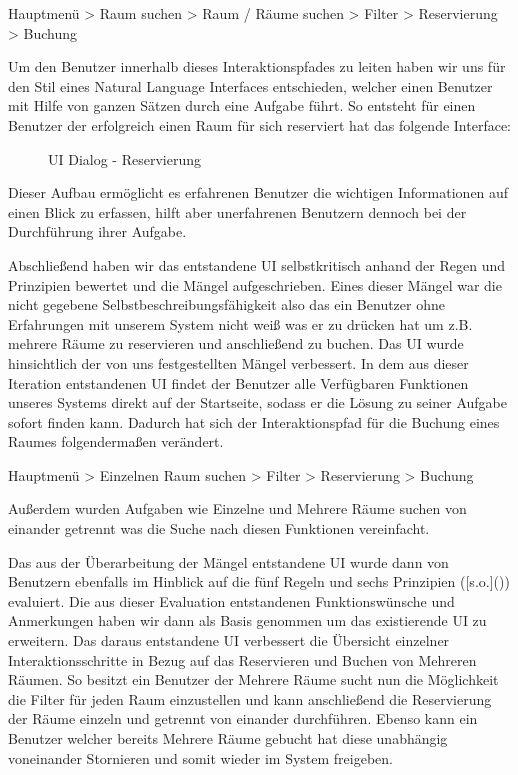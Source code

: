     Hauptmenü > Raum suchen > Raum / Räume suchen > Filter > Reservierung > Buchung

Um den Benutzer innerhalb dieses Interaktionspfades zu leiten haben wir uns
für den Stil eines Natural Language Interfaces entschieden, welcher einen
Benutzer mit Hilfe von ganzen Sätzen durch eine Aufgabe führt.
So entsteht \zB für einen Benutzer der erfolgreich einen Raum für sich
reserviert hat das folgende Interface:

\begin{figure}
	\centering
	\caption{UI Dialog - Reservierung}
\end{figure}

Dieser Aufbau ermöglicht es erfahrenen Benutzer die wichtigen Informationen auf
einen Blick zu erfassen, hilft aber unerfahrenen Benutzern dennoch bei der
Durchführung ihrer Aufgabe.

Abschließend haben wir das entstandene UI selbstkritisch anhand der Regen und
Prinzipien bewertet und die Mängel aufgeschrieben.
Eines dieser Mängel war die nicht gegebene Selbstbeschreibungsfähigkeit also
das ein Benutzer ohne Erfahrungen mit unserem System nicht weiß was er zu
drücken hat um z.B. mehrere Räume zu reservieren und anschließend zu buchen.
Das UI wurde hinsichtlich der von uns festgestellten Mängel verbessert.
In dem aus dieser Iteration entstandenen UI findet der Benutzer alle Verfügbaren
Funktionen unseres Systems direkt auf der Startseite, sodass er die Lösung zu
seiner Aufgabe sofort finden kann. Dadurch hat sich der Interaktionspfad für
die Buchung eines Raumes folgendermaßen verändert.

    Hauptmenü > Einzelnen Raum suchen > Filter > Reservierung > Buchung

Außerdem wurden Aufgaben wie Einzelne und Mehrere Räume suchen von einander
getrennt was die Suche nach diesen Funktionen vereinfacht.

Das aus der Überarbeitung der Mängel entstandene UI wurde dann von Benutzern
ebenfalls im Hinblick auf die fünf Regeln und sechs Prinzipien ([s.o.]())
evaluiert. Die aus dieser Evaluation entstandenen Funktionswünsche und
Anmerkungen haben wir dann als Basis genommen um das existierende UI zu
erweitern. Das daraus entstandene UI verbessert die Übersicht einzelner
Interaktionsschritte in Bezug auf das Reservieren und Buchen von Mehreren
Räumen. So besitzt ein Benutzer der Mehrere Räume sucht nun die Möglichkeit
die Filter für jeden Raum einzustellen und kann anschließend die Reservierung
der Räume einzeln und getrennt von einander durchführen. Ebenso kann ein
Benutzer welcher bereits Mehrere Räume gebucht hat diese unabhängig voneinander
Stornieren und somit wieder im System freigeben.

